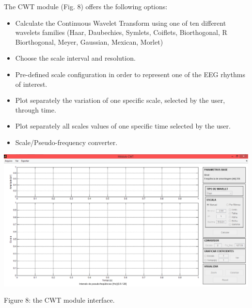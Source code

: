 \documentclass[12pt, a4paper]{article}
\begin{document}
The CWT module (Fig. 8) offers the following options:
\begin{itemize}
\item Calculate the Continuous Wavelet Transform using one of ten different wavelets families (Haar, Daubechies, Symlets, Coiflets, Biorthogonal, R Biorthogonal, Meyer, Gaussian, Mexican, Morlet)
\item Choose the scale interval and resolution.
\item Pre-defined scale configuration in order to represent one of the EEG rhythms of interest.
\item Plot separately the variation of one specific scale, selected by the user, through time.
\item Plot separately all scales values of one specific time selected by the user.
\item Scale/Pseudo-frequency converter.
\end{itemize}
\begin{center}
\includegraphics[width=15cm]{cwt.png}

Figure 8: the CWT module interface.
\end{center}
\end{document}
